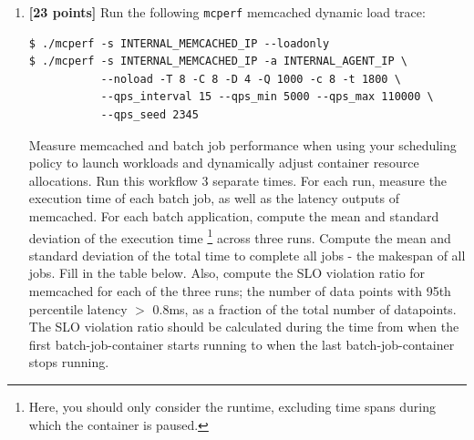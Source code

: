 \begin{enumerate}
\begin{itemize}
\textbf{Answer:} The main trade-off is makespan versus memcached SLO protection. The original conservative policy completed Q4.iii in $1208.52\pm33.00$ s with no SLO violations, but it left too much critical-path work serialized. We therefore tested a more aggressive policy that always overlapped the two long jobs; it reduced makespan in some runs but produced SLO violations above the 3\% target. The final opportunistic-overlap policy keeps this overlap only when memcached has been reduced to one core, and falls back to the conservative schedule when memcached needs more protection. With this design, Q4.iii improved to $968.19\pm23.20$ s while keeping the SLO violation ratio at $0.0\%$ in all three runs.
\end{itemize}

\item \textbf{[23 points]} Run the following \texttt{mcperf} memcached dynamic load trace: 
    
\begin{Verbatim}[fontsize=\small]
$ ./mcperf -s INTERNAL_MEMCACHED_IP --loadonly 
$ ./mcperf -s INTERNAL_MEMCACHED_IP -a INTERNAL_AGENT_IP \ 
           --noload -T 8 -C 8 -D 4 -Q 1000 -c 8 -t 1800 \ 
           --qps_interval 15 --qps_min 5000 --qps_max 110000 \ 
           --qps_seed 2345
\end{Verbatim}
    
    
    Measure memcached and batch job performance when using your scheduling policy to launch workloads and dynamically adjust container resource allocations. Run this workflow 3 separate times. For each run, measure the execution time of each batch job, as well as the latency outputs of memcached. For each batch application, compute the mean and standard deviation of the execution time \footnote{Here, you should only consider the runtime, excluding time spans during which the container is paused.} across three runs. Compute the mean and standard deviation of the total time to complete all jobs - the makespan of all jobs. Fill in the table below.  Also, compute the SLO violation ratio for memcached for each of the three runs; the number of data points with 95th percentile latency $>$ 0.8ms, as a fraction of the total number of datapoints. The SLO violation ratio should be calculated during the time from when the first batch-job-container starts running to when the last batch-job-container stops running. \\
    

\end{enumerate}
